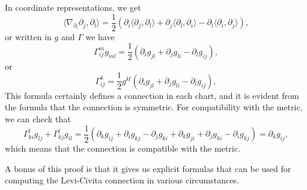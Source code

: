\documentclass[../main.tex]{subfiles}
\begin{document}
In coordinate representations, we get
\begin{equation}
	\langle \nabla_{\partial_i} \partial_j, \partial_l \rangle = \frac{1}{2} \left( \partial_i \langle \partial_j, \partial_l \rangle + \partial_j \langle \partial_l, \partial_i \rangle - \partial_l \langle \partial_i, \partial_j \rangle \right),
\end{equation}
or written in $g$ and $\Gamma$ we have
\begin{equation}
	\Gamma_{ij}^m g_{ml} = \frac{1}{2} \left( \partial_i g_{jl} + \partial_j g_{li} - \partial_l g_{ij} \right),
\end{equation}
or
\begin{equation}
	\Gamma_{ij}^k = \frac{1}{2} g^{kl} \left( \partial_i g_{jl} + \partial_j g_{li} - \partial_l g_{ij} \right),
\end{equation}
This formula certainly defines a connection in each chart, and it is evident from the formula that the connection is symmetric. For compatibility with the metric, we can check that
\begin{equation*}
	\Gamma_{ki}^l g_{lj} + \Gamma_{kj}^l g_{il} = \frac{1}{2} \left( \partial_k g_{ij} + \partial_i g_{kj} - \partial_j g_{ki} + \partial_k g_{ji} + \partial_j g_{ki} - \partial_i g_{kj} \right) = \partial_k g_{ij},
\end{equation*}
which means that the connection is compatible with the metric.

A bonus of this proof is that it gives us explicit formulas that can be used for computing the Levi-Civita connection in various circumstances.
\end{document}
